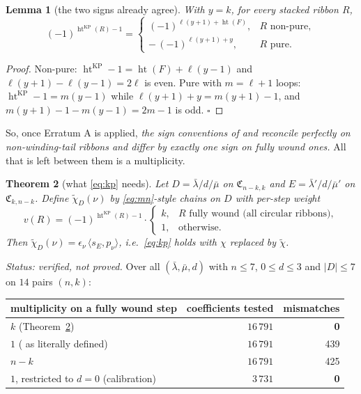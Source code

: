 \documentclass[11pt]{article}
\theoremstyle{plain}
\newtheorem{theorem}{Theorem}
\newtheorem{lemma}[theorem]{Lemma}
\theoremstyle{definition}
\theoremstyle{remark}
\DeclareMathOperator{\hgt}{ht}
\newcommand{\CC}{\mathfrak{C}}
\newcommand{\bl}{\bar\lambda}
\newcommand{\bm}{\bar\mu}
\begin{document}
\begin{lemma}[the two signs already agree]\label{lem:signs}
With $y=k$, for every stacked ribbon $R$,
\[
  (-1)^{\hgt^{\mathrm{KP}}(R)-1}=
  \begin{cases}
    (-1)^{\ell(y+1)+\hgt(F)}, & R \text{ non-pure},\\
    -\,(-1)^{\ell(y+1)+y}, & R \text{ pure}.
  \end{cases}
\]
\end{lemma}

\begin{proof}
Non-pure: $\hgt^{\mathrm{KP}}-1=\hgt(F)+\ell(y-1)$ and
$\ell(y+1)-\ell(y-1)=2\ell$ is even. Pure with $m=\ell+1$ loops:
$\hgt^{\mathrm{KP}}-1=m(y-1)$ while $\ell(y+1)+y=m(y+1)-1$, and
$m(y+1)-1-m(y-1)=2m-1$ is odd. $\square$
\end{proof}

So, once Erratum A is applied, \emph{the sign conventions of \cite{AKO} and \cite{KP} reconcile
perfectly on non-winding-tail ribbons and differ by exactly one sign on fully wound ones.} All that
is left between them is a multiplicity.

\begin{theorem}[what \eqref{eq:kp} needs]\label{thm:kp}
Let $D=\bl/d/\bm$ on $\CC_{n-k,k}$ and $E=\bl'/d/\bm'$ on $\CC_{k,n-k}$. Define
$\tilde\chi_D(\nu)$ by \eqref{eq:mn}-style chains on $D$ with per-step weight
\[
  v(R)=(-1)^{\hgt^{\mathrm{KP}}(R)-1}\cdot
  \begin{cases} k, & R \text{ fully wound (all circular ribbons)},\\ 1,&\text{otherwise.}\end{cases}
\]
Then $\tilde\chi_D(\nu)=\epsilon_\nu\,\langle s_E,p_\nu\rangle$, i.e.\ \eqref{eq:kp} holds with
$\chi$ replaced by $\tilde\chi$.
\end{theorem}

\emph{Status: verified, not proved.} Over all $(\bl,\bm,d)$ with $n\le7$, $0\le d\le3$ and
$|D|\le7$ on $14$ pairs $(n,k)$:

\begin{center}
\begin{tabular}{lrr}
\hline
multiplicity on a fully wound step & coefficients tested & mismatches\\
\hline
$k$ (Theorem~\ref{thm:kp}) & $16\,791$ & \textbf{0}\\
$1$ (\cite{KP} as literally defined) & $16\,791$ & 439\\
$n-k$ & $16\,791$ & 425\\
\hline
$1$, restricted to $d=0$ (calibration) & $3\,731$ & \textbf{0}\\
\hline
\end{tabular}
\end{center}
\end{document}
